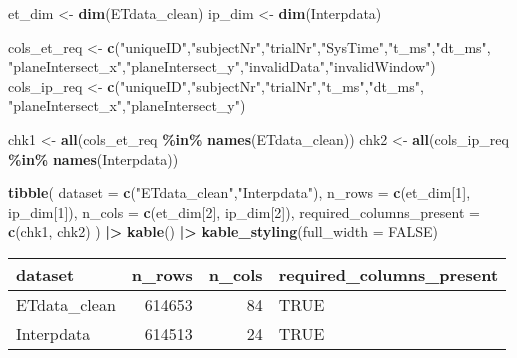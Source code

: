 \documentclass[
]{article}
\newenvironment{Shaded}{\begin{snugshade}}{\end{snugshade}}
\newcommand{\AttributeTok}[1]{\textcolor[rgb]{0.13,0.29,0.53}{#1}}
\newcommand{\ConstantTok}[1]{\textcolor[rgb]{0.56,0.35,0.01}{#1}}
\newcommand{\DecValTok}[1]{\textcolor[rgb]{0.00,0.00,0.81}{#1}}
\newcommand{\FunctionTok}[1]{\textcolor[rgb]{0.13,0.29,0.53}{\textbf{#1}}}
\newcommand{\NormalTok}[1]{#1}
\newcommand{\OtherTok}[1]{\textcolor[rgb]{0.56,0.35,0.01}{#1}}
\newcommand{\SpecialCharTok}[1]{\textcolor[rgb]{0.81,0.36,0.00}{\textbf{#1}}}
\newcommand{\StringTok}[1]{\textcolor[rgb]{0.31,0.60,0.02}{#1}}
\begin{document}
\begin{Shaded}
\begin{Highlighting}[]
\NormalTok{et\_dim }\OtherTok{\textless{}{-}} \FunctionTok{dim}\NormalTok{(ETdata\_clean)}
\NormalTok{ip\_dim }\OtherTok{\textless{}{-}} \FunctionTok{dim}\NormalTok{(Interpdata)}

\NormalTok{cols\_et\_req }\OtherTok{\textless{}{-}} \FunctionTok{c}\NormalTok{(}\StringTok{"uniqueID"}\NormalTok{,}\StringTok{"subjectNr"}\NormalTok{,}\StringTok{"trialNr"}\NormalTok{,}\StringTok{"SysTime"}\NormalTok{,}\StringTok{"t\_ms"}\NormalTok{,}\StringTok{"dt\_ms"}\NormalTok{,}
                 \StringTok{"planeIntersect\_x"}\NormalTok{,}\StringTok{"planeIntersect\_y"}\NormalTok{,}\StringTok{"invalidData"}\NormalTok{,}\StringTok{"invalidWindow"}\NormalTok{)}
\NormalTok{cols\_ip\_req }\OtherTok{\textless{}{-}} \FunctionTok{c}\NormalTok{(}\StringTok{"uniqueID"}\NormalTok{,}\StringTok{"subjectNr"}\NormalTok{,}\StringTok{"trialNr"}\NormalTok{,}\StringTok{"t\_ms"}\NormalTok{,}\StringTok{"dt\_ms"}\NormalTok{,}
                 \StringTok{"planeIntersect\_x"}\NormalTok{,}\StringTok{"planeIntersect\_y"}\NormalTok{)}

\NormalTok{chk1 }\OtherTok{\textless{}{-}} \FunctionTok{all}\NormalTok{(cols\_et\_req }\SpecialCharTok{\%in\%} \FunctionTok{names}\NormalTok{(ETdata\_clean))}
\NormalTok{chk2 }\OtherTok{\textless{}{-}} \FunctionTok{all}\NormalTok{(cols\_ip\_req }\SpecialCharTok{\%in\%} \FunctionTok{names}\NormalTok{(Interpdata))}

\FunctionTok{tibble}\NormalTok{(}
  \AttributeTok{dataset =} \FunctionTok{c}\NormalTok{(}\StringTok{"ETdata\_clean"}\NormalTok{,}\StringTok{"Interpdata"}\NormalTok{),}
  \AttributeTok{n\_rows  =} \FunctionTok{c}\NormalTok{(et\_dim[}\DecValTok{1}\NormalTok{], ip\_dim[}\DecValTok{1}\NormalTok{]),}
  \AttributeTok{n\_cols  =} \FunctionTok{c}\NormalTok{(et\_dim[}\DecValTok{2}\NormalTok{], ip\_dim[}\DecValTok{2}\NormalTok{]),}
  \AttributeTok{required\_columns\_present =} \FunctionTok{c}\NormalTok{(chk1, chk2)}
\NormalTok{) }\SpecialCharTok{|\textgreater{}}
  \FunctionTok{kable}\NormalTok{() }\SpecialCharTok{|\textgreater{}}
  \FunctionTok{kable\_styling}\NormalTok{(}\AttributeTok{full\_width =} \ConstantTok{FALSE}\NormalTok{)}
\end{Highlighting}
\end{Shaded}

\begin{longtable}[t]{lrrl}
\toprule
dataset & n\_rows & n\_cols & required\_columns\_present\\
\midrule
ETdata\_clean & 614653 & 84 & TRUE\\
Interpdata & 614513 & 24 & TRUE\\
\bottomrule
\end{longtable}
\end{document}
